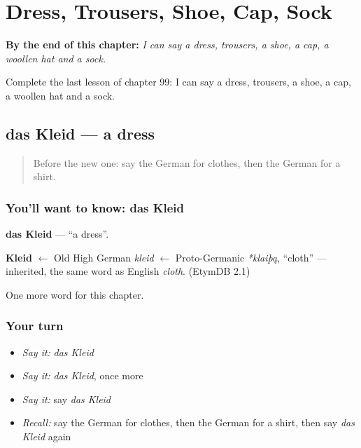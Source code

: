 
\chapter{Dress, Trousers, Shoe, Cap, Sock}
\label{ch:ge-dress-trousers-shoe-cap-sock}

\begin{chapteropening}
\textbf{By the end of this chapter:} \emph{I can say a dress, trousers, a shoe, a cap, a woollen hat and a sock.}

Complete the last lesson of chapter 99: I can say a dress, trousers, a shoe, a cap, a woollen hat and a sock.
\end{chapteropening}

\section[das Kleid]{das Kleid — a dress}

\label{lesson:GE-C99-kleid}



\begin{quote}
Before the new one: say the German for clothes, then the German for a shirt.
\end{quote}

\subsection*{You'll want to know: das Kleid}
\textbf{das Kleid} — \textquotedblleft{}a dress\textquotedblright{}.

\begin{cousinweb}
\textbf{Kleid} $\leftarrow$ Old High German \emph{kleid} $\leftarrow$ Proto-Germanic \emph{*klaiþą}, \textquotedblleft{}cloth\textquotedblright{} — inherited, the same word as English \emph{cloth}. (EtymDB 2.1)
\end{cousinweb}

\begin{grammarlens}[title={What you've built}]
One more word for this chapter.
\end{grammarlens}

\subsection*{Your turn}
\begin{itemize}
\raggedright
  \item \emph{Say it:} \emph{das Kleid}
  \item \emph{Say it:} \emph{das Kleid}, once more
  \item \emph{Say it:} say \emph{das Kleid}
  \item \emph{Recall:} say the German for clothes, then the German for a shirt, then say \emph{das Kleid} again
\end{itemize}

